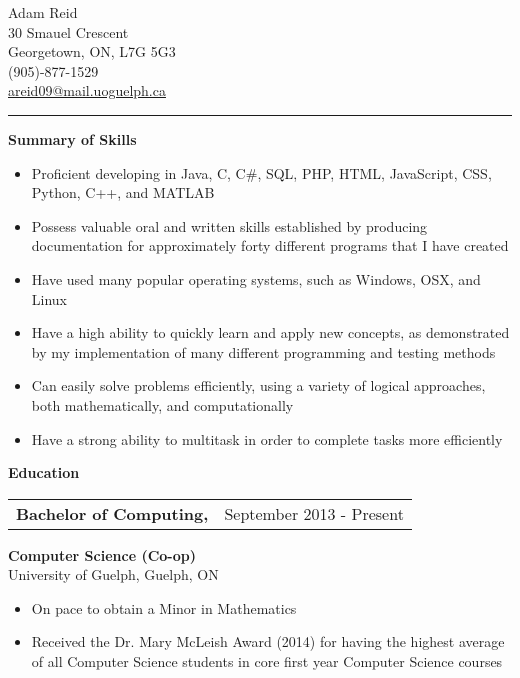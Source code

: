 \documentclass[12pt]{article}
\newcommand{\doublespace}{\vspace{8pt}}
\begin{document}
{\huge Adam Reid}\\
30 Smauel Crescent\\
Georgetown, ON, L7G 5G3\\
(905)-877-1529\\
\href{mailto:areid09@mail.uoguelph.ca}{areid09@mail.uoguelph.ca}
\noindent\rule{6in}{0.4pt}

\doublespace

\textbf{Summary of Skills}

\doublespace

{ 
  \small
  \begin{itemize}
    \item Proficient developing in Java, C, C\#, SQL, PHP, HTML, JavaScript, CSS, Python, C++, and MATLAB
    \item Possess valuable oral and written skills established by producing documentation for approximately forty different programs that I have created
    \item Have used many popular operating systems, such as Windows, OSX, and Linux
    \item Have a high ability to quickly learn and apply new concepts, as demonstrated by my implementation of many different programming and testing methods
    \item Can easily solve problems efficiently, using a variety of logical approaches, both mathematically, and computationally
    \item Have a strong ability to multitask in order to complete tasks more efficiently
  \end{itemize}
}

\doublespace

\textbf{Education}

\doublespace

{
  \small
  \noindent\begin{tabu} {@{} X[l] X[r]}
    \textbf{Bachelor of Computing,} & September 2013 - Present
  \end{tabu}
  \textbf{Computer Science (Co-op)}\\
  University of Guelph, Guelph, ON
  \begin{itemize}
    \item On pace to obtain a Minor in Mathematics
    \item Received the Dr. Mary McLeish Award (2014) for having the highest average of all Computer Science students in core first year Computer Science courses
  \end{itemize}
}
\end{document}
